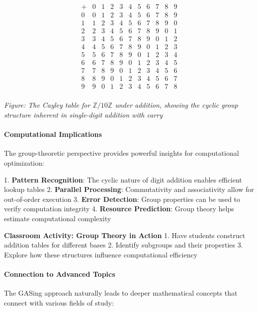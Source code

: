 $$
\begin{array}{c|cccccccccc}
+ & 0 & 1 & 2 & 3 & 4 & 5 & 6 & 7 & 8 & 9 \\
\hline
0 & 0 & 1 & 2 & 3 & 4 & 5 & 6 & 7 & 8 & 9 \\
1 & 1 & 2 & 3 & 4 & 5 & 6 & 7 & 8 & 9 & 0 \\
2 & 2 & 3 & 4 & 5 & 6 & 7 & 8 & 9 & 0 & 1 \\
3 & 3 & 4 & 5 & 6 & 7 & 8 & 9 & 0 & 1 & 2 \\
4 & 4 & 5 & 6 & 7 & 8 & 9 & 0 & 1 & 2 & 3 \\
5 & 5 & 6 & 7 & 8 & 9 & 0 & 1 & 2 & 3 & 4 \\
6 & 6 & 7 & 8 & 9 & 0 & 1 & 2 & 3 & 4 & 5 \\
7 & 7 & 8 & 9 & 0 & 1 & 2 & 3 & 4 & 5 & 6 \\
8 & 8 & 9 & 0 & 1 & 2 & 3 & 4 & 5 & 6 & 7 \\
9 & 9 & 0 & 1 & 2 & 3 & 4 & 5 & 6 & 7 & 8 \\
\end{array}
$$

\emph{Figure: The Cayley table for $\mathbb{Z}/10\mathbb{Z}$ under addition, showing the cyclic group structure inherent in single-digit addition with carry}
\paragraph{Computational Implications}

The group-theoretic perspective provides powerful insights for computational optimization:

1. \textbf{Pattern Recognition}: The cyclic nature of digit addition enables efficient lookup tables
2. \textbf{Parallel Processing}: Commutativity and associativity allow for out-of-order execution
3. \textbf{Error Detection}: Group properties can be used to verify computation integrity
4. \textbf{Resource Prediction}: Group theory helps estimate computational complexity

\textbf{Classroom Activity: Group Theory in Action}
1. Have students construct addition tables for different bases
2. Identify subgroups and their properties
3. Explore how these structures influence computational efficiency
\paragraph{Connection to Advanced Topics}

The GASing approach naturally leads to deeper mathematical concepts that connect with various fields of study:


